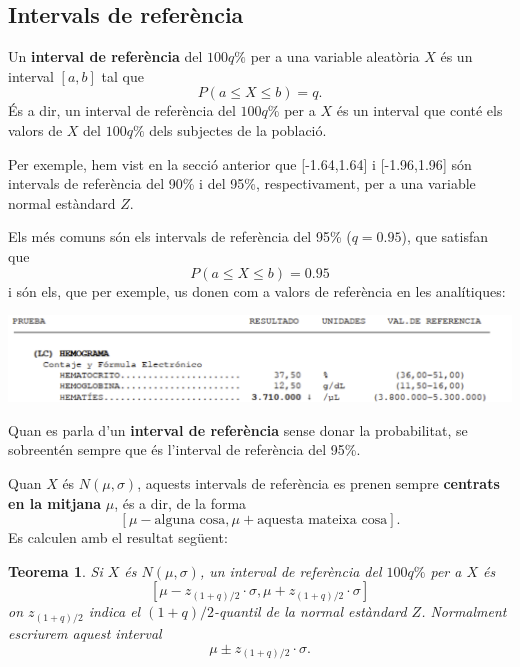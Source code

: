 \documentclass[
]{book}
\renewcommand{\leq}{\leqslant}
\newenvironment{rmdblock}[1]
  {
  \begin{itemize}
  \renewcommand{\labelitemi}{
    \raisebox{-.7\height}[0pt][0pt]{
      {\setkeys{Gin}{width=3em,keepaspectratio}\texttt{[image: Bioestadística-II\_files/figure-html/\#1]}}
    }
  }
  \setlength{\fboxsep}{1em}
  \begin{kframe}
  \item
  }
  {
  \end{kframe}
  \end{itemize}
  }
\newenvironment{rmdnote}
  {\begin{rmdblock}{note}}
  {\end{rmdblock}}
\newtheorem{theorem}{Teorema}[chapter]
\theoremstyle{definition}
\theoremstyle{definition}
\theoremstyle{definition}
\theoremstyle{remark}
\begin{document}
\hypertarget{intervals-de-referuxe8ncia}{%
\subsection{Intervals de referència}\label{intervals-de-referuxe8ncia}}

Un \textbf{interval de referència} del \(100q\%\) per a una variable aleatòria \(X\) és un interval \([a,b]\) tal que
\[
P(a\leq X\leq b)=q.
\]
És a dir, un interval de referència del \(100q\%\) per a \(X\) és un interval que conté els valors de \(X\) del \(100q\%\) dels subjectes de la població.

Per exemple, hem vist en la secció anterior que {[}-1.64,1.64{]} i {[}-1.96,1.96{]} són intervals de referència del 90\% i del 95\%, respectivament, per a una variable normal estàndard \(Z\).

Els més comuns són els intervals de referència del 95\% (\(q=0.95\)), que satisfan que
\[
P(a\leq X\leq b)=0.95
\]
i són els, que per exemple, us donen com a valors de referència en les analítiques:

\begin{center}\includegraphics[width=0.8\linewidth]{Bioestadistica-II_files/figure-html/analit} \end{center}

\begin{rmdnote}
Quan es parla d'un \textbf{interval de referència} sense donar la probabilitat, se sobreentén sempre que és l'interval de referència del 95\%.
\end{rmdnote}

Quan \(X\) és \(N(\mu,\sigma)\), aquests intervals de referència es prenen sempre \textbf{centrats en la mitjana} \(\mu\), és a dir, de la forma
\[
[\mu-\text{alguna cosa},\mu+\text{aquesta mateixa cosa}].
\]
Es calculen amb el resultat següent:

\begin{theorem}
\protect\hypertarget{thm:unnamed-chunk-108}{}{\label{thm:unnamed-chunk-108} }Si \(X\) és \(N(\mu,\sigma)\), un interval de referència del \(100q\%\) per a \(X\) és
\[
[\mu- z_{(1+q)/2}\cdot \sigma, \mu+ z_{(1+q)/2}\cdot \sigma]
\]
on \(z_{(1+q)/2}\) indica el \((1+q)/2\)-quantil de la normal estàndard \(Z\). Normalment escriurem aquest interval
\[
\mu\pm z_{(1+q)/2}\cdot \sigma.
\]
\end{theorem}
\end{document}
